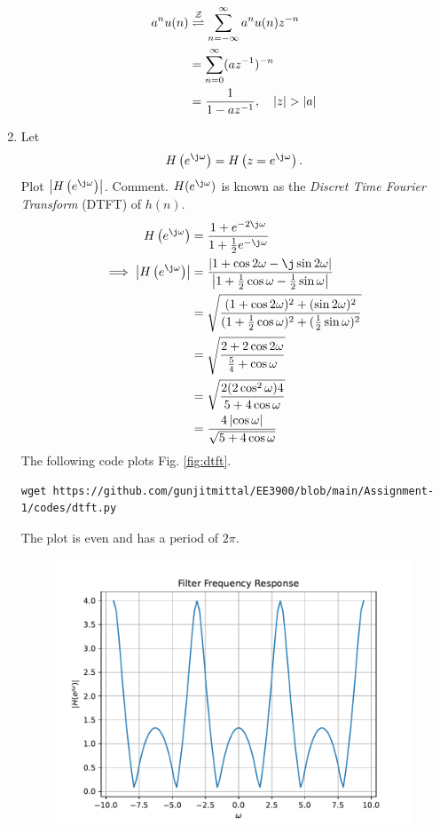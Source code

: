 \documentclass[journal,12pt,twocolumn]{IEEEtran}
\renewcommand\thesection{\arabic{section}}
\begin{document}
\begin{enumerate}[label=\thesection.\arabic*]
\solution
\begin{align}
  a^nu(n) &\overset{\mathcal{Z}}{ \rightleftharpoons} \sum _{n=-\infty }^{\infty }a^n u(n)z^{-n}\\
  &= \sum _{n=0 }^{\infty } (az^{-1})^{-n}\\
  &=\frac{1}{1-az^{-1}}, \quad \left\vert z\right\vert > \left\vert a\right\vert
\end{align}
\item 
Let
\begin{equation}
H\brak{e^{\j \omega}} = H\brak{z = e^{\j \omega}}.
\end{equation}
Plot $\abs{H\brak{e^{\j \omega}}}$.  Comment.  $H(e^{\j \omega})$ is
known as the {\em Discret Time Fourier Transform} (DTFT) of $h(n)$.
\\
\solution
\begin{align}
  H\brak{e^{\j \omega}} &= \frac{1 + e^{-2\j\omega}}{1 + \frac12 e^{-\j\omega}} \\
  \implies \abs{H\brak{e^{\j \omega}}} &= \frac{\abs{1 + \cos2\omega - \j\sin2\omega}}{\abs{1 + \frac12 \cos\omega - \frac12 \sin\omega}} \\
  &= \sqrt{\frac{(1 + \cos2\omega)^2 + (\sin2\omega)^2}{(1 + \frac12 \cos\omega)^2 + (\frac12 \sin\omega)^2}} \\
  &= \sqrt{\frac{2 + 2\cos2\omega}{\frac54 + \cos\omega}} \\
  &= \sqrt{\frac{2(2\cos^2\omega)4}{5 + 4\cos\omega} } \\
  &= \frac{4\abs{\cos\omega}}{\sqrt{5 + 4\cos\omega}}
\end{align}
 The following code plots Fig. \ref{fig:dtft}.
\begin{lstlisting}
wget https://github.com/gunjitmittal/EE3900/blob/main/Assignment-1/codes/dtft.py
\end{lstlisting}
The plot is even and has a period of $2\pi $.
\begin{figure}[!ht]
\centering
\includegraphics[width=\columnwidth]{./figs/dtft}

\end{figure}
\end{enumerate}
\end{document}
